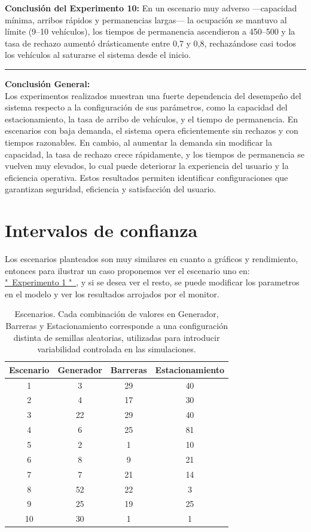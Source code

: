 \documentclass[12pt]{article}
\begin{document}
\textbf{Conclusión del Experimento 10:} En un escenario muy adverso —capacidad mínima, arribos rápidos y permanencias largas— la ocupación se mantuvo al límite (9–10 vehículos), los tiempos de permanencia ascendieron a 450–500 y la tasa de rechazo aumentó drásticamente entre 0,7 y 0,8, rechazándose casi todos los vehículos al saturarse el sistema desde el inicio.

\vspace{2cm}
\hrule
\vspace{0.5cm}

\textbf{Conclusión General:} \\
Los experimentos realizados muestran una fuerte dependencia del desempeño del sistema respecto a la configuración de sus parámetros, como la capacidad del estacionamiento, la tasa de arribo de vehículos, y el tiempo de permanencia. En escenarios con baja demanda, el sistema opera eficientemente sin rechazos y con tiempos razonables. En cambio, al aumentar la demanda sin modificar la capacidad, la tasa de rechazo crece rápidamente, y los tiempos de permanencia se vuelven muy elevados, lo cual puede deteriorar la experiencia del usuario y la eficiencia operativa. Estos resultados permiten identificar configuraciones que garantizan seguridad, eficiencia y satisfacción del usuario.

\clearpage

\section{Intervalos de confianza}
Los escenarios planteados son muy similares en cuanto a gráficos y rendimiento, entonces para ilustrar un caso proponemos ver el escenario uno en: \hyperlink{exp1}{"\ Experimento 1 "\ }, y si se desea ver el resto, se puede modificar los parametros en el modelo y ver los resultados arrojados por el monitor.


\begin{table}[H]
\centering
\begin{tabular}{|c|c|c|c|}
\hline
\textbf{Escenario} & \textbf{Generador} & \textbf{Barreras} & \textbf{Estacionamiento} \\
\hline
1 & 3  & 29 & 40 \\
2 & 4  & 17 & 30 \\
3 & 22 & 29 & 40 \\
4 & 6  & 25 & 81 \\
5 & 2  & 1  & 10 \\
6 & 8  & 9  & 21 \\
7 & 7  & 21 & 14 \\
8 & 52 & 22 & 3  \\
9 & 25 & 19 & 25 \\
10 & 30 & 1  & 1  \\
\hline
\end{tabular}
\caption{Escenarios. Cada combinación de valores en Generador, Barreras y Estacionamiento corresponde a una configuración distinta de semillas aleatorias, utilizadas para introducir variabilidad controlada en las simulaciones.}
\end{table}
\end{document}
